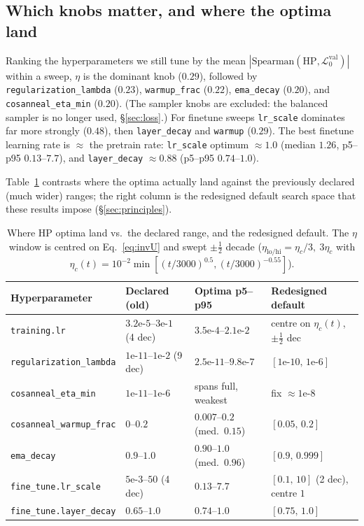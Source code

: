 \documentclass[11pt]{article}
\newcommand{\abs}[1]{\left\lvert #1 \right\rvert}
\newcommand{\vlnr}{\mathcal{L}^{\mathrm{val}}_{0}}   %
\newcommand{\code}[1]{\texttt{#1}}
\begin{document}
\subsection{Which knobs matter, and where the optima land}

Ranking the hyperparameters we still tune by the mean $\abs{\text{Spearman}(\text{HP},\vlnr)}$
within a sweep, $\eta$ is the dominant knob ($0.29$), followed by
\code{regularization\_lambda} ($0.23$), \code{warmup\_frac} ($0.22$), \code{ema\_decay}
($0.20$), and \code{cosanneal\_eta\_min} ($0.20$). (The sampler knobs are excluded: the
balanced sampler is no longer used, \S\ref{sec:loss}.) For finetune sweeps \code{lr\_scale}
dominates far more strongly ($0.48$), then \code{layer\_decay} and \code{warmup} ($0.29$). The
best finetune learning rate is $\approx$ the pretrain rate: \code{lr\_scale} optimum $\approx
1.0$ (median $1.26$, p5--p95 $0.13$--$7.7$), and \code{layer\_decay} $\approx 0.88$ (p5--p95
$0.74$--$1.0$).

Table~\ref{tab:searchspace} contrasts where the optima actually land against the previously
declared (much wider) ranges; the right column is the redesigned default search space that
these results impose (\S\ref{sec:principles}).

\begin{table}[H]
\centering
\caption{Where HP optima land vs.\ the declared range, and the redesigned default. The
$\eta$ window is centred on Eq.~\eqref{eq:invU} and swept $\pm\tfrac12$ decade
($\eta_{\mathrm{lo/hi}}=\eta_c/3,\ 3\eta_c$ with
$\eta_c(t)=10^{-2}\min[(t/3000)^{0.5},(t/3000)^{-0.55}]$).}
\label{tab:searchspace}
\begin{tabular}{@{}llll@{}}
\toprule
Hyperparameter & Declared (old) & Optima p5--p95 & Redesigned default \\
\midrule
\code{training.lr} & $3.2\text{e-}5$--$3\text{e-}1$ (4 dec) & $3.5\text{e-}4$--$2.1\text{e-}2$ & centre on $\eta_c(t)$, $\pm\tfrac12$ dec \\
\code{regularization\_lambda} & $1\text{e-}11$--$1\text{e-}2$ (9 dec) & $2.5\text{e-}11$--$9.8\text{e-}7$ & $[1\text{e-}10,\,1\text{e-}6]$ \\
\code{cosanneal\_eta\_min} & $1\text{e-}11$--$1\text{e-}6$ & spans full, weakest & fix $\approx 1\text{e-}8$ \\
\code{cosanneal\_warmup\_frac} & $0$--$0.2$ & $0.007$--$0.2$ (med.\ $0.15$) & $[0.05,\,0.2]$ \\
\code{ema\_decay} & $0.9$--$1.0$ & $0.90$--$1.0$ (med.\ $0.96$) & $[0.9,\,0.999]$ \\
\code{fine\_tune.lr\_scale} & $5\text{e-}3$--$50$ (4 dec) & $0.13$--$7.7$ & $[0.1,\,10]$ (2 dec), centre $1$ \\
\code{fine\_tune.layer\_decay} & $0.65$--$1.0$ & $0.74$--$1.0$ & $[0.75,\,1.0]$ \\
\bottomrule
\end{tabular}
\end{table}
\end{document}
